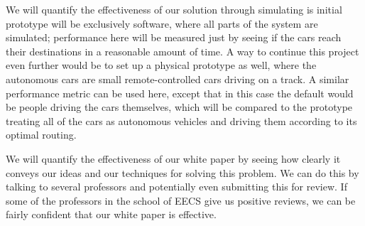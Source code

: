 \documentclass[letterpaper, 10 pt, conference, draftclsnofoot, onecolumn]{ieeeconf}
\begin{document}
    We will quantify the effectiveness of our solution through simulating is initial prototype will be exclusively software, where all parts of the system are simulated; performance here will be measured just by seeing if the cars reach their destinations in a reasonable amount of time. A way to continue this project even further would be to set up a physical prototype as well, where the autonomous cars are small remote-controlled cars driving on a track. A similar performance metric can be used here, except that in this case the default would be people driving the cars themselves, which will be compared to the prototype treating all of the cars as autonomous vehicles and driving them according to its optimal routing.
    
    We will quantify the effectiveness of our white paper by seeing how clearly it conveys our ideas and our techniques for solving this problem. We can do this by talking to several professors and potentially even submitting this for review. If some of the professors in the school of EECS give us positive reviews, we can be fairly confident that our white paper is effective.
\end{document}
